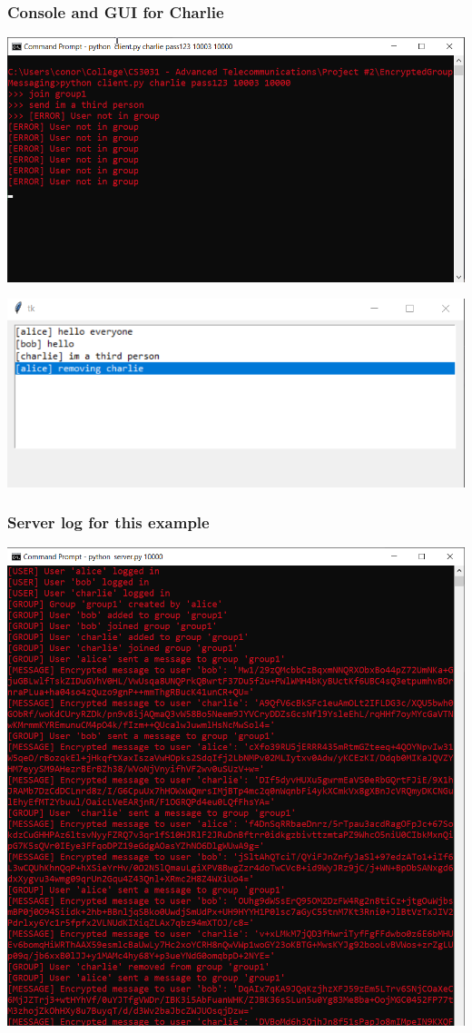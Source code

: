 \documentclass[12pt]{article}
\begin{document}
\subsubsection{Console and GUI for Charlie}

\includegraphics[scale=0.8]{charlie_console.png}

\includegraphics[scale=0.8]{charlie_gui.png}

\subsubsection{Server log for this example}

\includegraphics[scale=0.8]{server.png}
\end{document}

